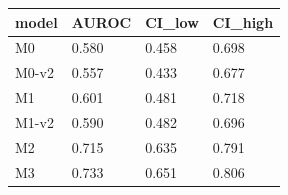 \begin{tabular}{llll}
\toprule
model & AUROC & CI\_low & CI\_high \\
\midrule
M0 & 0.580 & 0.458 & 0.698 \\
M0-v2 & 0.557 & 0.433 & 0.677 \\
M1 & 0.601 & 0.481 & 0.718 \\
M1-v2 & 0.590 & 0.482 & 0.696 \\
M2 & 0.715 & 0.635 & 0.791 \\
M3 & 0.733 & 0.651 & 0.806 \\
\bottomrule
\end{tabular}
